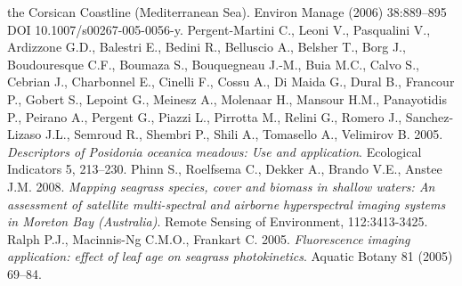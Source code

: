 \documentclass[11pt]{article}
\begin{document}
\begin{thebibliography}{999}
{the Corsican Coastline (Mediterranean Sea)}. Environ Manage (2006) 38:889–895 DOI
10.1007/s00267-005-0056-y. \pageref{Pergent-Martini06}
Pergent-Martini C., Leoni V., Pasqualini V., Ardizzone G.D., Balestri E., Bedini R., Belluscio A., Belsher T., Borg J., Boudouresque C.F., Boumaza S., Bouquegneau J.-M., Buia M.C., Calvo S., Cebrian J., Charbonnel E., Cinelli F., Cossu A., Di Maida G., Dural B., Francour P., Gobert S., Lepoint G., Meinesz A., Molenaar H., Mansour H.M., Panayotidis P., Peirano A., Pergent G., Piazzi L., Pirrotta M., Relini G., Romero J., Sanchez-Lizaso J.L., Semroud R., Shembri P., Shili A., Tomasello A., Velimirov B. 2005. \emph{Descriptors of \textit{{Posidonia oceanica}} meadows: Use and application}. Ecological Indicators 5, 213–230. \pageref{Pergent-Martini05}
Phinn S., Roelfsema C., Dekker A., Brando V.E., Anstee J.M. 2008. \emph{Mapping seagrass species, cover and biomass in shallow waters: An assessment of satellite multi-spectral and airborne
hyperspectral imaging systems in Moreton Bay (Australia)}. Remote Sensing of Environment, 112:3413-3425. \pageref{Phinn08}
Ralph P.J., Macinnis-Ng C.M.O., Frankart C. 2005. \emph{Fluorescence imaging application: effect of leaf age on seagrass photokinetics}. Aquatic Botany 81 (2005) 69–84. \pageref{Ralph05}

\end{thebibliography}
\end{document}

